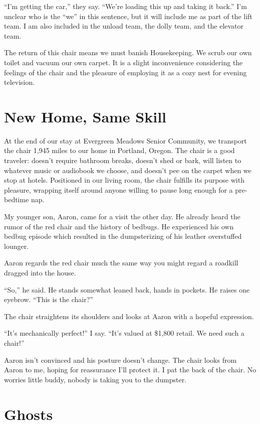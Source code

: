 \documentclass[
  letterpaper,
  DIV=11,
  numbers=noendperiod]{scrreprt}
\begin{document}
``I'm getting the car,'' they say. ``We're loading this up and taking it
back.'' I'm unclear who is the ``we'' in this sentence, but it will
include me as part of the lift team. I am also included in the unload
team, the dolly team, and the elevator team.

The return of this chair means we must banish Housekeeping. We scrub our
own toilet and vacuum our own carpet. It is a slight inconvenience
considering the feelings of the chair and the pleasure of employing it
as a cozy nest for evening television.

\section*{New Home, Same Skill}\label{new-home-same-skill}


At the end of our stay at Evergreen Meadows Senior Community, we
transport the chair 1,945 miles to our home in Portland, Oregon. The
chair is a good traveler: doesn't require bathroom breaks, doesn't shed
or bark, will listen to whatever music or audiobook we choose, and
doesn't pee on the carpet when we stop at hotels. Positioned in our
living room, the chair fulfills its purpose with pleasure, wrapping
itself around anyone willing to pause long enough for a pre-bedtime nap.

My younger son, Aaron, came for a visit the other day. He already heard
the rumor of the red chair and the history of bedbugs. He experienced
his own bedbug episode which resulted in the dumpsterizing of his
leather overstuffed lounger.

Aaron regards the red chair much the same way you might regard a
roadkill dragged into the house.

``So,'' he said. He stands somewhat leaned back, hands in pockets. He
raises one eyebrow. ``This is the chair?''

The chair straightens its shoulders and looks at Aaron with a hopeful
expression.

``It's mechanically perfect!'' I say. ``It's valued at \$1,800 retail.
We need such a chair!''

Aaron isn't convinced and his posture doesn't change. The chair looks
from Aaron to me, hoping for reassurance I'll protect it. I pat the back
of the chair. No worries little buddy, nobody is taking you to the
dumpster.

\section*{Ghosts}\label{ghosts}
\end{document}

